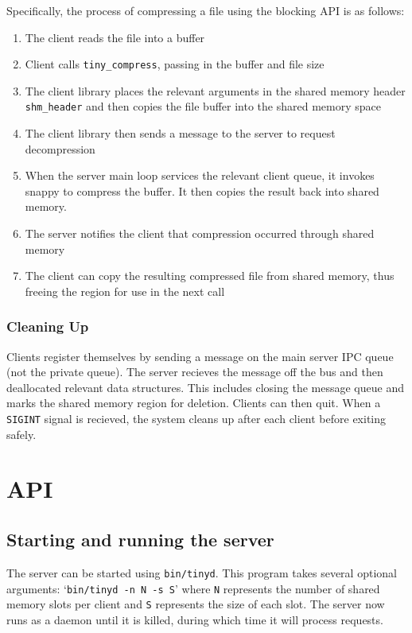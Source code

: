 \documentclass[paper=a4,fontsize=11pt]{report} %
\numberwithin{equation}{section} %
\numberwithin{figure}{section} %
\numberwithin{table}{section} %
\begin{document}
Specifically, the process of compressing a file using the blocking API is as follows:
\begin{enumerate}
\item The client reads the file into a buffer
\item Client calls \texttt{tiny\_compress}, passing in the buffer and file size
\item The client library places the relevant arguments in the shared memory header \texttt{shm\_header} and then copies the file buffer into the shared memory space
\item The client library then sends a message to the server to request decompression
\item When the server main loop services the relevant client queue, it invokes snappy to compress the buffer. It then copies the result back into shared memory.
\item The server notifies the client that compression occurred through shared memory
\item The client can copy the resulting compressed file from shared memory, thus freeing the region for use in the next call
\end{enumerate}

\subsubsection{Cleaning Up}

Clients register themselves by sending a message on the main server IPC queue (not the private queue). The server recieves the message off the bus and then deallocated relevant data structures. This includes closing the message queue and marks the shared memory region for deletion. Clients can then quit. When a \texttt{SIGINT} signal is recieved, the system cleans up after each client before exiting safely.

\section{API}

\subsection{Starting and running the server}
The server can be started using \texttt{bin/tinyd}. This program takes several optional arguments: `\texttt{bin/tinyd -n N -s S}' where \texttt{N} represents the number of shared memory slots per client and \texttt{S} represents the size of each slot. The server now runs as a daemon until it is killed, during which time it will process requests.
\end{document}
